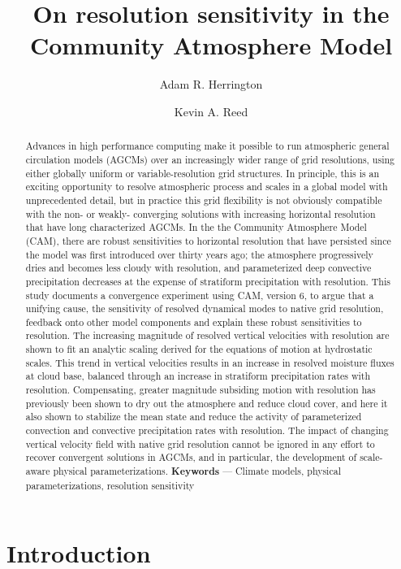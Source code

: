 \documentclass[alpha-refs]{wiley-article}
\title{On resolution sensitivity in the Community Atmosphere Model}
\author[1]{Adam R. Herrington}
\affil[1]{School of Marine and Atmospheric Sciences, Stony Brook University, Stony Brook, NY 11794, USA}
\author[1]{Kevin A. Reed}
\begin{document}
\maketitle
{}
\begin{abstract}
Advances in high performance computing make it possible to run atmospheric general circulation models (AGCMs) over an increasingly wider range of grid resolutions, using either globally uniform or variable-resolution grid structures. In principle, this is an exciting opportunity to resolve atmospheric process and scales in a global model with unprecedented detail, but in practice this grid flexibility is not obviously compatible with the non- or weakly- converging solutions with increasing horizontal resolution that have long characterized AGCMs. In the the Community Atmosphere Model (CAM), there are robust sensitivities to horizontal resolution that have persisted since the model was first introduced over thirty years ago; the atmosphere progressively dries and becomes less cloudy with resolution, and parameterized deep convective precipitation decreases at the expense of stratiform precipitation with resolution. This study documents a convergence experiment using CAM, version 6, to argue that a unifying cause, the sensitivity of resolved dynamical modes to native grid resolution, feedback onto other model components and explain these robust sensitivities to resolution. The increasing magnitude of resolved vertical velocities with resolution are shown to fit an analytic scaling derived for the equations of motion at hydrostatic scales. This trend in vertical velocities results in an increase in resolved moisture fluxes at cloud base, balanced through an increase in stratiform precipitation rates with resolution. Compensating, greater magnitude subsiding motion with resolution has previously been shown to dry out the atmosphere and reduce cloud cover, and here it also shown to stabilize the mean state and reduce the activity of parameterized convection and convective precipitation rates with resolution. The impact of changing vertical velocity field with native grid resolution cannot be ignored in any effort to recover convergent solutions in AGCMs, and in particular, the development of scale-aware physical parameterizations.
\textbf{Keywords} --- Climate models, physical parameterizations, resolution sensitivity%
\end{abstract}%

\section{Introduction}
\end{document}

